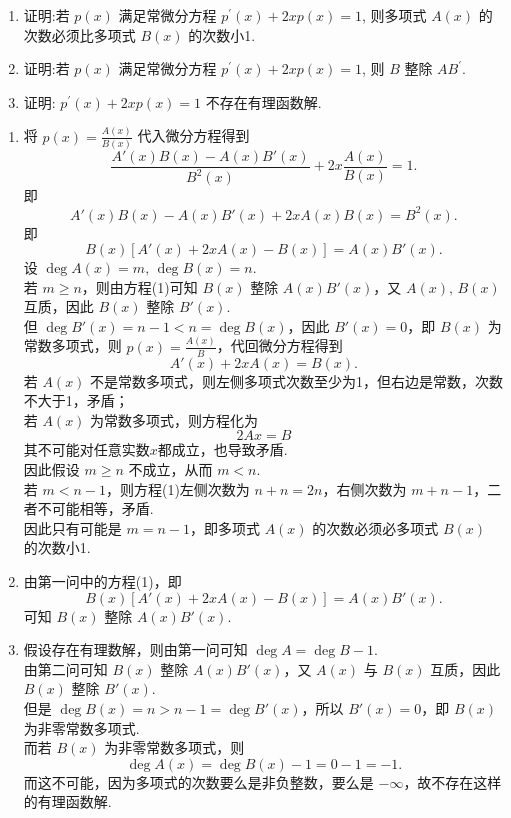 \begin{enumerate}
    \item[1.]证明:若 $p(x)$ 满足常微分方程 $\displaystyle p^{\prime}(x) + 2x p(x) = 1$,
    则多项式 $A(x)$ 的次数必须比多项式 $B(x)$ 的次数小1.
    \item[2.]证明:若 $p(x)$ 满足常微分方程 $\displaystyle p^{\prime}(x) + 2x p(x) = 1$, 则 $B$ 整除 $A B^{\prime}$.
    \item[3.]证明: $\displaystyle p^{\prime}(x) + 2x p(x) = 1$ 不存在有理函数解.
\end{enumerate}
\begin{solution}
    \begin{enumerate}
    \item[1.]
    将 $\displaystyle p(x)=\frac{A(x)}{B(x)}$ 代入微分方程得到
    \[
    \frac{A'(x)B(x)-A(x)B'(x)}{B^2(x)}+2x\frac{A(x)}{B(x)}=1.
    \]
    即
    \[
    A'(x)B(x)-A(x)B'(x)+2xA(x)B(x)=B^2(x).
    \]
    即
    \[
    B(x)\left[A'(x)+2xA(x)-B(x)\right]=A(x)B'(x). \tag{1}
    \]
    设 $\deg A(x)=m,\,\deg B(x)=n$.\\
    若 $m\geq n$，则由方程(1)可知 $B(x)$ 整除 $A(x)B'(x)$，又 $A(x),\,B(x)$ 互质，因此 $B(x)$ 整除 $B'(x)$.\\
    但 $\deg B'(x)=n-1<n=\deg B(x)$，因此 $B'(x)=0$，即 $B(x)$ 为常数多项式，则 $p(x)=\frac{A(x)}{B}$，代回微分方程得到
    \[
    A'(x)+2xA(x)=B(x).
    \]
    若 $A(x)$ 不是常数多项式，则左侧多项式次数至少为1，但右边是常数，次数不大于1，矛盾；\\
    若 $A(x)$ 为常数多项式，则方程化为
    \[
    2Ax=B
    \]
    其不可能对任意实数$x$都成立，也导致矛盾.\\
    因此假设 $m\geq n$ 不成立，从而 $m<n$.\\
    若 $m<n-1$，则方程(1)左侧次数为 $n+n=2n$，右侧次数为 $m+n-1$，二者不可能相等，矛盾.\\
    因此只有可能是 $m=n-1$，即多项式 $A(x)$ 的次数必须必多项式 $B(x)$ 的次数小1. 

    \item[2.]
    由第一问中的方程(1)，即
    \[
    B(x)\left[A'(x)+2xA(x)-B(x)\right]=A(x)B'(x). 
    \]
    可知 $B(x)$ 整除 $A(x)B'(x)$.

    \item[3.]
    假设存在有理数解，则由第一问可知 $\deg A=\deg B-1$.\\
    由第二问可知 $B(x)$ 整除 $A(x)B'(x)$，又 $A(x)$ 与 $B(x)$ 互质，因此 $B(x)$ 整除 $B'(x)$.\\
    但是 $\deg B(x)=n>n-1=\deg B'(x)$，所以 $B'(x)=0$，即 $B(x)$ 为非零常数多项式.\\
    而若 $B(x)$ 为非零常数多项式，则
    \[
    \deg A(x)=\deg B(x)-1=0-1=-1.
    \]
    而这不可能，因为多项式的次数要么是非负整数，要么是 $-\infty$，故不存在这样的有理函数解.
    \end{enumerate}
\end{solution}